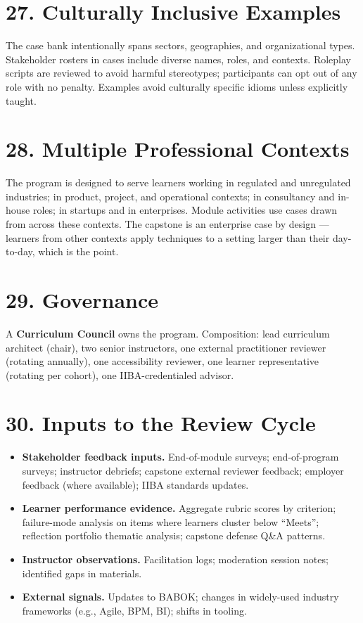 \documentclass[11pt,letterpaper,oneside]{report}
\begin{document}
\section*{27. Culturally Inclusive Examples}
The case bank intentionally spans sectors, geographies, and organizational types. Stakeholder rosters in cases include diverse names, roles, and contexts. Roleplay scripts are reviewed to avoid harmful stereotypes; participants can opt out of any role with no penalty. Examples avoid culturally specific idioms unless explicitly taught.

\section*{28. Multiple Professional Contexts}
The program is designed to serve learners working in regulated and unregulated industries; in product, project, and operational contexts; in consultancy and in-house roles; in startups and in enterprises. Module activities use cases drawn from across these contexts. The capstone is an enterprise case by design --- learners from other contexts apply techniques to a setting larger than their day-to-day, which is the point.


\section*{29. Governance}
A \textbf{Curriculum Council} owns the program. Composition: lead curriculum architect (chair), two senior instructors, one external practitioner reviewer (rotating annually), one accessibility reviewer, one learner representative (rotating per cohort), one IIBA-credentialed advisor.

\section*{30. Inputs to the Review Cycle}
\begin{itemize}
  \item \textbf{Stakeholder feedback inputs.} End-of-module surveys; end-of-program surveys; instructor debriefs; capstone external reviewer feedback; employer feedback (where available); IIBA standards updates.
  \item \textbf{Learner performance evidence.} Aggregate rubric scores by criterion; failure-mode analysis on items where learners cluster below ``Meets''; reflection portfolio thematic analysis; capstone defense Q\&A patterns.
  \item \textbf{Instructor observations.} Facilitation logs; moderation session notes; identified gaps in materials.
  \item \textbf{External signals.} Updates to BABOK; changes in widely-used industry frameworks (e.g., Agile, BPM, BI); shifts in tooling.
\end{itemize}
\end{document}
